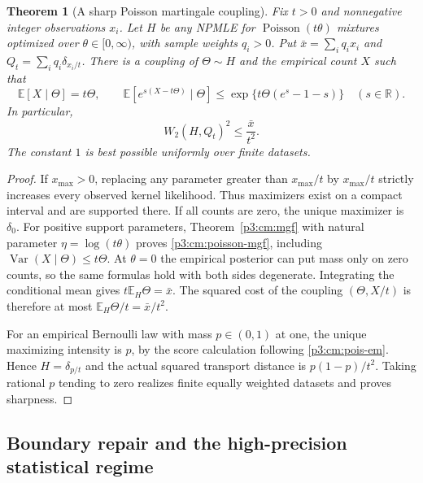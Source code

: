 \documentclass[11pt,a4paper]{article}
\newtheorem{theorem}{Theorem}[section]
\theoremstyle{definition}
\theoremstyle{remark}
\numberwithin{equation}{section}
\begin{document}
\begin{theorem}[A sharp Poisson martingale coupling]
\label{p3:cm:poisson}
Fix $t>0$ and nonnegative integer observations $x_i$.  Let $H$ be any
NPMLE for $\operatorname{Poisson}(t\theta)$ mixtures optimized over
$\theta\in[0,\infty)$, with sample weights $q_i>0$.  Put
$\bar x=\sum_iq_ix_i$ and $Q_t=\sum_iq_i\delta_{x_i/t}$.
There is a coupling of $\Theta\sim H$ and the empirical count $X$ such
that
\begin{equation}\label{p3:cm:poisson-mgf}
 \mathbb E[X\mid\Theta]=t\Theta,\qquad
 \mathbb E[e^{s(X-t\Theta)}\mid\Theta]
    \le\exp\{t\Theta(e^s-1-s)\}\quad(s\in\mathbb R).
\end{equation}
In particular,
\begin{equation}\label{p3:cm:poisson-cost}
 W_2(H,Q_t)^2\le\frac{\bar x}{t^2}.
\end{equation}
The constant $1$ is best possible uniformly over finite datasets.
\end{theorem}

\begin{proof}
If $x_{\max}>0$, replacing any parameter greater than $x_{\max}/t$ by
$x_{\max}/t$ strictly increases every observed kernel likelihood.
Thus maximizers exist on a compact interval and are supported there.
If all counts are zero, the unique maximizer is $\delta_0$.
For positive support parameters, Theorem~\ref{p3:cm:mgf} with natural
parameter $\eta=\log(t\theta)$ proves \eqref{p3:cm:poisson-mgf}, including
$\operatorname{Var}(X\mid\Theta)\le t\Theta$.
At $\theta=0$ the empirical posterior can put mass only on zero
counts, so the same formulas hold with both sides degenerate.
Integrating the conditional mean gives $t\mathbb E_H\Theta=\bar x$.
The squared cost of the coupling $(\Theta,X/t)$ is therefore at most
$\mathbb E_H\Theta/t=\bar x/t^2$.

For an empirical Bernoulli law with mass $p\in(0,1)$ at one, the
unique maximizing intensity is $p$, by the score calculation following
\eqref{p3:cm:pois-em}.  Hence $H=\delta_{p/t}$ and the actual squared
transport distance is $p(1-p)/t^2$.  Taking rational $p$ tending to
zero realizes finite equally weighted datasets and proves sharpness.
\end{proof}

\subsection{Boundary repair and the high-precision statistical regime}
\end{document}
